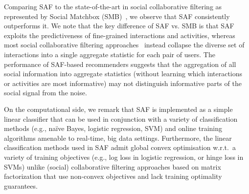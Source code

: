 Comparing SAF to the state-of-the-art in social collaborative
filtering as represented by Social Matchbox (SMB)~\cite{Noel2012NOF},
we observe that SAF consistently outperforms it.  We note that the key
difference of SAF vs. SMB is that SAF exploits the predictiveness of
fine-grained interactions and activities, whereas most
social collaborative filtering
approaches~\cite{socinf,rrmf,ste,sorec,sr,Noel2012NOF,lla} instead
collapse the diverse set of interactions into a single aggregate
statistic for each pair of users.  The performance of SAF-based
recommenders suggests that the aggregation of all social information
into aggregate statistics (without learning which interactions or
activities are most informative) may not distinguish informative 
parts of the social signal from the noise.

On the computational side, we remark that SAF is implemented as a
simple linear classifier that can be used in conjunction with a
variety of classification methods (e.g., na\"{i}ve Bayes, logistic
regression, SVM) and online training algorithms amenable to real-time,
big data settings.  Furthermore, the linear classification methods
used in SAF admit global convex optimisation w.r.t.\ a variety of
training objectives (e.g., log loss in logistic regression, or hinge
loss in SVMs) unlike (social) collaborative filtering approaches based
on matrix factorization that use non-convex objectives and lack training
optimality guarantees.

